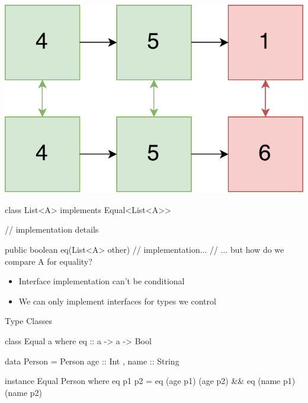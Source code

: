 \documentclass[usenames,dvipsnames,svgnames,table,aspectratio=169,mathserif]{beamer}
\newcommand{\nl}{\vspace{\baselineskip}}
\newcommand{\pnl}{\pause \nl}
\begin{document}
\begin{frame}
\begin{center}
\includegraphics[scale=0.5]{listcompare4.pdf}
\end{center}
\end{frame}


\begin{frame}[fragile]
\begin{javacode}
class List<A> implements Equal<List<A>> {
  // implementation details

  public boolean eq(List<A> other) {
    // implementation...
    // ... but how do we compare A for equality?
  }
}
\end{javacode}
\end{frame}


\begin{frame}
\begin{itemize}
\item Interface implementation can't be conditional
\item We can only implement interfaces for types we control
\end{itemize}

\end{frame}




\begin{frame}
\begin{center}
\huge{Type Classes}
\end{center}
\end{frame}


\begin{frame}[fragile]
\begin{haskellcode}
class Equal a where
  eq :: a -> a -> Bool
\end{haskellcode}

\pnl

\begin{haskellcode}
data Person = Person {
  age :: Int
, name :: String
}
\end{haskellcode}

\pnl

\begin{haskellcode}
instance Equal Person where
  eq p1 p2 = eq (age p1) (age p2) && eq (name p1) (name p2)
\end{haskellcode}

\end{frame}
\end{document}
